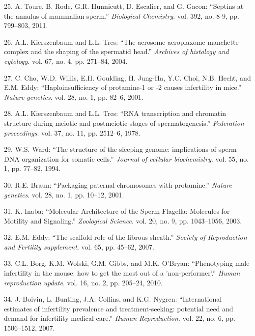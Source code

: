 \documentclass[12pt,a4paper,twoside]{ugathesis}
\theoremstyle{definition}
\theoremstyle{definition}
\theoremstyle{definition}
\theoremstyle{remark}
\begin{document}
\hypertarget{ref-Toure2011}{}
25. A. Toure, B. Rode, G.R. Hunnicutt, D. Escalier, and G. Gacon:
``Septins at the annulus of mammalian sperm.'' \emph{Biological
Chemistry}. vol. 392, no. 8-9, pp. 799--803, 2011.

\hypertarget{ref-Kierszenbaum2004}{}
26. A.L. Kierszenbaum and L.L. Tres: ``The
acrosome-acroplaxome-manchette complex and the shaping of the spermatid
head.'' \emph{Archives of histology and cytology}. vol. 67, no. 4, pp.
271--84, 2004.

\hypertarget{ref-Cho2001}{}
27. C. Cho, W.D. Willis, E.H. Goulding, H. Jung-Ha, Y.C. Choi, N.B.
Hecht, and E.M. Eddy: ``Haploinsufficiency of protamine-1 or -2 causes
infertility in mice.'' \emph{Nature genetics}. vol. 28, no. 1, pp.
82--6, 2001.

\hypertarget{ref-Kierszenbaum1978}{}
28. A.L. Kierszenbaum and L.L. Tres: ``RNA transcription and chromatin
structure during meiotic and postmeiotic stages of spermatogenesis.''
\emph{Federation proceedings}. vol. 37, no. 11, pp. 2512--6, 1978.

\hypertarget{ref-Ward1994}{}
29. W.S. Ward: ``The structure of the sleeping genome: implications of
sperm DNA organization for somatic cells.'' \emph{Journal of cellular
biochemistry}. vol. 55, no. 1, pp. 77--82, 1994.

\hypertarget{ref-Braun2001}{}
30. R.E. Braun: ``Packaging paternal chromosomes with protamine.''
\emph{Nature genetics}. vol. 28, no. 1, pp. 10--12, 2001.

\hypertarget{ref-Inaba2003}{}
31. K. Inaba: ``Molecular Architecture of the Sperm Flagella: Molecules
for Motility and Signaling.'' \emph{Zoological Science}. vol. 20, no. 9,
pp. 1043--1056, 2003.

\hypertarget{ref-Eddy2007}{}
32. E.M. Eddy: ``The scaffold role of the fibrous sheath.''
\emph{Society of Reproduction and Fertility supplement}. vol. 65, pp.
45--62, 2007.

\hypertarget{ref-Borg2010}{}
33. C.L. Borg, K.M. Wolski, G.M. Gibbs, and M.K. O'Bryan: ``Phenotyping
male infertility in the mouse: how to get the most out of a
'non-performer'.'' \emph{Human reproduction update}. vol. 16, no. 2, pp.
205--24, 2010.

\hypertarget{ref-Boivin2007a}{}
34. J. Boivin, L. Bunting, J.A. Collins, and K.G. Nygren:
``International estimates of infertility prevalence and
treatment-seeking: potential need and demand for infertility medical
care.'' \emph{Human Reproduction}. vol. 22, no. 6, pp. 1506--1512, 2007.
\end{document}

